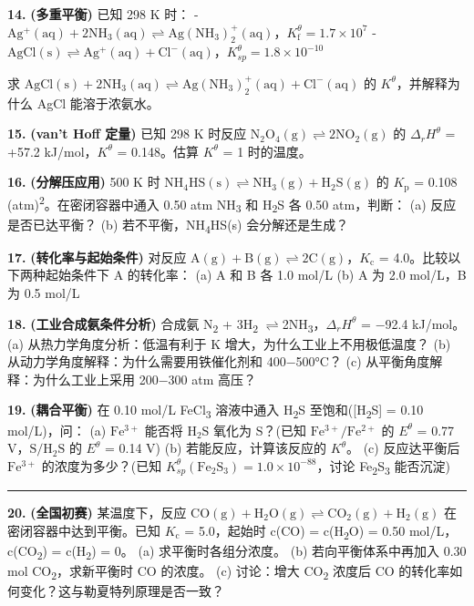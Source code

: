 \documentclass[a4paper,11pt]{ctexart}
\newcommand{\箭}{\ensuremath{\rightarrow}}
\newcommand{\左箭}{\ensuremath{\leftarrow}}
\newcommand{\上箭}{\ensuremath{\uparrow}}
\newcommand{\下箭}{\ensuremath{\downarrow}}
\newcommand{\衡}{\ensuremath{\rightleftharpoons}}
\newcommand{\双箭}{\ensuremath{\leftrightarrow}}
\newcommand{\约等于}{\ensuremath{\approx}}
\newcommand{\小于等于}{\ensuremath{\leq}}
\newcommand{\大于等于}{\ensuremath{\geq}}
\newcommand{\不等于}{\ensuremath{\neq}}
\newcommand{\西格马}{\ensuremath{\sigma}}
\newcommand{\派}{\ensuremath{\pi}}
\begin{document}
\textbf{14.} \textbf{(多重平衡)} 已知 298 K 时：
- \(\mathrm{Ag^+(aq) + 2NH_3(aq) \rightleftharpoons Ag(NH_3)_2^+(aq)}\)，\(K_{\mathrm f}^\theta = 1.7 \times 10^7\)
- \(\mathrm{AgCl(s) \rightleftharpoons Ag^+(aq) + Cl^-(aq)}\)，\(K_{sp}^\theta = 1.8 \times 10^{-10}\)

求 \(\mathrm{AgCl(s) + 2NH_3(aq) \rightleftharpoons Ag(NH_3)_2^+(aq) + Cl^-(aq)}\) 的 \(K^\theta\)，并解释为什么 AgCl 能溶于浓氨水。

\textbf{15.} \textbf{(van't Hoff 定量)} 已知 298 K 时反应 \(\mathrm{N_2O_4(g) \rightleftharpoons 2NO_2(g)}\) 的 \(\Delta_r H^\theta\) = +57.2 kJ/mol，\(K^\theta\) = 0.148。估算 \(K^\theta\) = 1 时的温度。

\textbf{16.} \textbf{(分解压应用)} 500 K 时 \(\mathrm{NH_4HS(s) \rightleftharpoons NH_3(g) + H_2S(g)}\) 的 \(K_{\mathrm p}\) = 0.108 (atm)\textsuperscript{2}。在密闭容器中通入 0.50 atm NH\textsubscript{3} 和 H\textsubscript{2}S 各 0.50 atm，判断：
(a) 反应是否已达平衡？
(b) 若不平衡，NH\textsubscript{4}HS(s) 会分解还是生成？

\textbf{17.} \textbf{(转化率与起始条件)} 对反应 \(\mathrm{A(g) + B(g) \rightleftharpoons 2C(g)}\)，\(K_{\mathrm c}\) = 4.0。比较以下两种起始条件下 A 的转化率：
(a) A 和 B 各 1.0 mol/L
(b) A 为 2.0 mol/L，B 为 0.5 mol/L

\textbf{18.} \textbf{(工业合成氨条件分析)} 合成氨 N\textsubscript{2} + 3H\textsubscript{2} \衡 2NH\textsubscript{3}，\(\Delta_r H^\theta\) = −92.4 kJ/mol。
(a) 从热力学角度分析：低温有利于 K 增大，为什么工业上不用极低温度？
(b) 从动力学角度解释：为什么需要用铁催化剂和 400−500°C？
(c) 从平衡角度解释：为什么工业上采用 200−300 atm 高压？

\textbf{19.} \textbf{(耦合平衡)} 在 0.10 mol/L FeCl\textsubscript{3} 溶液中通入 H\textsubscript{2}S 至饱和({[}H\textsubscript{2}S{]} = 0.10 mol/L)，问：
(a) \(\mathrm{Fe^{3+}}\) 能否将 \(\mathrm{H_2S}\) 氧化为 \(\mathrm{S}\)？(已知 \(\mathrm{Fe^{3+}/Fe^{2+}}\) 的 \(E^\theta\) = 0.77 V，\(\mathrm{S/H_2S}\) 的 \(E^\theta\) = 0.14 V)
(b) 若能反应，计算该反应的 \(K^\theta\)。
(c) 反应达平衡后 \(\mathrm{Fe^{3+}}\) 的浓度为多少？(已知 \(K_{sp}^\theta(\mathrm{Fe_2S_3}) = 1.0 \times 10^{-88}\)，讨论 Fe\textsubscript{2}S\textsubscript{3} 能否沉淀)

\begin{center}\rule{0.5\linewidth}{0.5pt}\end{center}

\textbf{20.} \textbf{(全国初赛)} 某温度下，反应 \(\mathrm{CO(g) + H_2O(g) \rightleftharpoons CO_2(g) + H_2(g)}\) 在密闭容器中达到平衡。已知 \(K_{\mathrm c}\) = 5.0，起始时 c(CO) = c(H\textsubscript{2}O) = 0.50 mol/L，c(CO\textsubscript{2}) = c(H\textsubscript{2}) = 0。
(a) 求平衡时各组分浓度。
(b) 若向平衡体系中再加入 0.30 mol CO\textsubscript{2}，求新平衡时 CO 的浓度。
(c) 讨论：增大 CO\textsubscript{2} 浓度后 CO 的转化率如何变化？这与勒夏特列原理是否一致？
\end{document}
